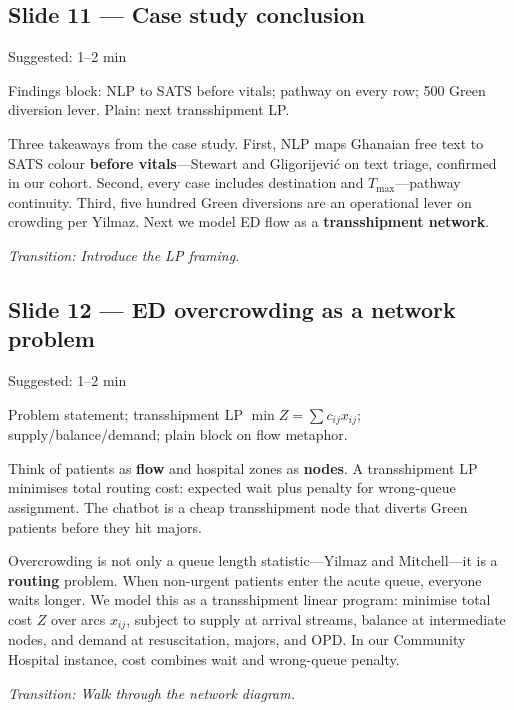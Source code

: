 \documentclass[11pt]{article}
\newcommand{\transition}[1]{\medskip\noindent\textit{\textcolor{knustMuted}{Transition: #1}}\medskip}
\newcommand{\deck}[1]{{\small\texttt{\textcolor{knustMuted}{main.pdf slide: #1}}}}
\newcommand{\slide}[3]{%
  \subsection{Slide #1 --- #2}%
  \noindent\deck{#1 --- #3}\par\smallskip}
\begin{document}
\slide{11}{Case study conclusion}{Community Hospital}
\begin{timing}Suggested: 1--2 min\end{timing}
\begin{onscreen}
Findings block: NLP to SATS before vitals; pathway on every row; 500 Green diversion lever. Plain: next transshipment LP.
\end{onscreen}
\begin{saybox}
Three takeaways from the case study. First, NLP maps Ghanaian free text to SATS colour \textbf{before
vitals}---Stewart and Gligorijevi\'c on text triage, confirmed in our cohort. Second, every case includes
destination and $T_{\max}$---pathway continuity. Third, five hundred Green diversions are an operational
lever on crowding per Yilmaz. Next we model ED flow as a \textbf{transshipment network}.
\end{saybox}
\transition{Introduce the LP framing.}

\slide{12}{ED overcrowding as a network problem}{Transshipment}
\begin{timing}Suggested: 1--2 min\end{timing}
\begin{onscreen}
Problem statement; transshipment LP $\min Z = \sum c_{ij} x_{ij}$; supply/balance/demand; plain block on flow metaphor.
\end{onscreen}
\begin{idea}
Think of patients as \textbf{flow} and hospital zones as \textbf{nodes}. A transshipment LP minimises
total routing cost: expected wait plus penalty for wrong-queue assignment. The chatbot is a cheap
transshipment node that diverts Green patients before they hit majors.
\end{idea}
\begin{saybox}
Overcrowding is not only a queue length statistic---Yilmaz and Mitchell---it is a \textbf{routing} problem.
When non-urgent patients enter the acute queue, everyone waits longer. We model this as a
transshipment linear program: minimise total cost $Z$ over arcs $x_{ij}$, subject to supply at arrival
streams, balance at intermediate nodes, and demand at resuscitation, majors, and OPD. In our Community
Hospital instance, cost combines wait and wrong-queue penalty.
\end{saybox}
\transition{Walk through the network diagram.}
\end{document}

